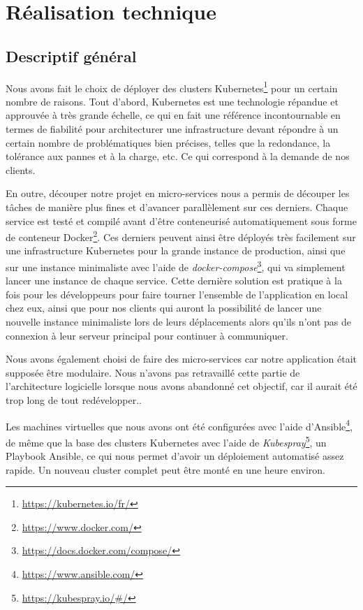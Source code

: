 \chapter{Réalisation technique}

\section{Descriptif général}

Nous avons fait le choix de déployer des clusters
Kubernetes\footnote{\url{https://kubernetes.io/fr/}}
pour un certain nombre de raisons. Tout d'abord, Kubernetes est une
technologie répandue et approuvée à très grande échelle, ce qui en fait
une référence incontournable en termes de fiabilité pour architecturer
une infrastructure devant répondre à un certain nombre de problématiques
bien précises, telles que la redondance, la tolérance aux pannes et à la
charge, etc. Ce qui correspond à la demande de nos clients.

En outre, découper notre projet en micro-services nous a permis de
découper les tâches de manière plus fines et d'avancer parallèlement sur
ces derniers. Chaque service est testé et compilé avant d'être
conteneurisé automatiquement sous forme de conteneur
Docker\footnote{\url{https://www.docker.com/}}. Ces
derniers peuvent ainsi être déployés très facilement sur une
infrastructure Kubernetes pour la grande instance de production, ainsi
que sur une instance minimaliste avec l'aide de
\textit{docker-compose}\footnote{\url{https://docs.docker.com/compose/}},
qui va simplement lancer une instance de chaque service. Cette dernière
solution est pratique à la fois pour les développeurs pour faire tourner
l'ensemble de l'application en local chez eux, ainsi que pour nos
clients qui auront la possibilité de lancer une nouvelle instance
minimaliste lors de leurs déplacements alors qu'ils n'ont pas de
connexion à leur serveur principal pour continuer à communiquer.

Nous avons également choisi de faire des micro-services car notre
application était supposée être modulaire. Nous n'avons pas retravaillé
cette partie de l'architecture logicielle lorsque nous avons abandonné
cet objectif, car il aurait été trop long de tout redévelopper..

Les machines virtuelles que nous avons ont été configurées avec l'aide
d'Ansible\footnote{\url{https://www.ansible.com/}}, de
même que la base des clusters Kubernetes avec l'aide de
\textit{Kubespray}\footnote{\url{https://kubespray.io/\#/}}, un
Playbook Ansible, ce qui nous permet d'avoir un déploiement automatisé
assez rapide. Un nouveau cluster complet peut être monté en une heure
environ.

